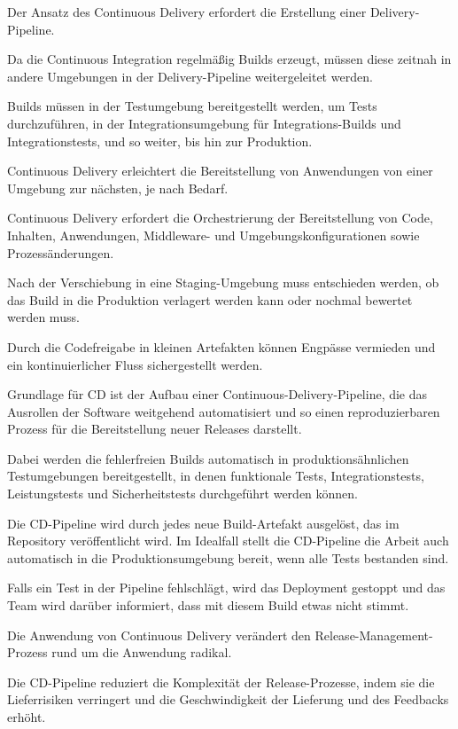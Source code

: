 Der Ansatz des Continuous Delivery erfordert die Erstellung einer Delivery-Pipeline. 

Da die Continuous Integration regelmäßig Builds erzeugt, müssen diese zeitnah in andere Umgebungen in der Delivery-Pipeline weitergeleitet werden.

Builds müssen in der Testumgebung bereitgestellt werden, um Tests durchzuführen, in der Integrationsumgebung für Integrations-Builds und Integrationstests, und so weiter, bis hin zur Produktion.

Continuous Delivery erleichtert die Bereitstellung von Anwendungen von einer Umgebung zur nächsten, je nach Bedarf.

Continuous Delivery erfordert die Orchestrierung der Bereitstellung von Code, Inhalten, Anwendungen, Middleware- und Umgebungskonfigurationen sowie Prozessänderungen. 


Nach der Verschiebung in eine Staging-Umgebung muss entschieden werden, ob das Build in die Produktion verlagert werden kann oder nochmal bewertet werden muss. 

Durch die Codefreigabe in kleinen Artefakten können Engpässe vermieden und ein kontinuierlicher Fluss sichergestellt werden. 


Grundlage für CD ist der Aufbau einer Continuous-Delivery-Pipeline, die das Ausrollen der Software weitgehend automatisiert und so einen reproduzierbaren Prozess für die Bereitstellung neuer Releases darstellt. 


Dabei werden die fehlerfreien Builds automatisch in produktionsähnlichen Testumgebungen bereitgestellt, in denen funktionale Tests, Integrationstests, Leistungstests und Sicherheitstests durchgeführt werden können.

Die CD-Pipeline wird durch jedes neue Build-Artefakt ausgelöst, das im Repository veröffentlicht wird. Im Idealfall stellt die CD-Pipeline die Arbeit auch automatisch in die Produktionsumgebung bereit, wenn alle Tests bestanden sind. 

Falls ein Test in der Pipeline fehlschlägt, wird das Deployment gestoppt und das Team wird darüber informiert, dass mit diesem Build etwas nicht stimmt. 

Die Anwendung von Continuous Delivery verändert den Release-Management-Prozess rund um die Anwendung radikal. 

Die CD-Pipeline reduziert die Komplexität der Release-Prozesse, indem sie die Lieferrisiken verringert und die Geschwindigkeit der Lieferung und des Feedbacks erhöht. 

